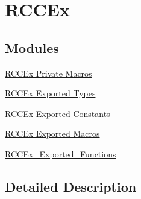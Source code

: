 \hypertarget{group___r_c_c_ex}{}\section{R\+C\+C\+Ex}
\label{group___r_c_c_ex}
\subsection*{Modules}
\begin{DoxyCompactItemize}
\item 
\hyperlink{group___r_c_c_ex___private___macros}{R\+C\+C\+Ex Private Macros}
\item 
\hyperlink{group___r_c_c_ex___exported___types}{R\+C\+C\+Ex Exported Types}
\item 
\hyperlink{group___r_c_c_ex___exported___constants}{R\+C\+C\+Ex Exported Constants}
\item 
\hyperlink{group___r_c_c_ex___exported___macros}{R\+C\+C\+Ex Exported Macros}
\item 
\hyperlink{group___r_c_c_ex___exported___functions}{R\+C\+C\+Ex\+\_\+\+Exported\+\_\+\+Functions}
\end{DoxyCompactItemize}


\subsection{Detailed Description}
